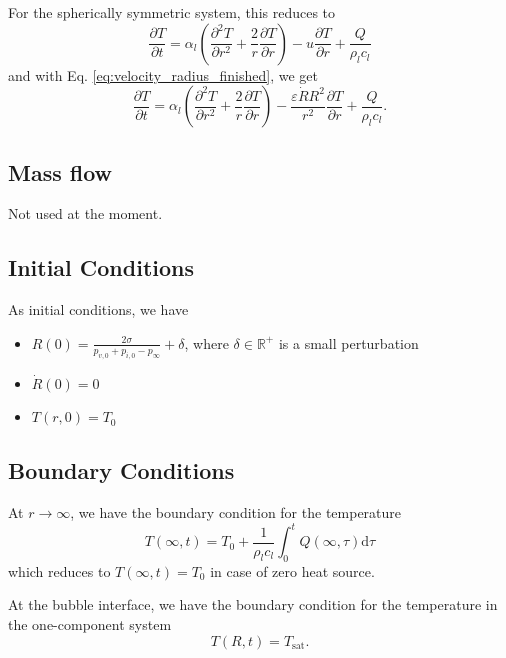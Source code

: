 \documentclass{article}
\numberwithin{equation}{section}
\newcommand{\dd}{\mathrm{d}}
\newcommand{\pd}[2]{\dfrac{\partial #1}{\partial #2}}
\newcommand{\pdd}[2]{\dfrac{\partial^2 #1}{\partial #2^2}}
\begin{document}
For the spherically symmetric system, this reduces to
\begin{equation}
    \pd{T}{t}
    =
    \alpha_l \left(\pdd{T}{r} + \frac{2}{r} \pd{T}{r}\right)
    - u \pd{T}{r}
    + \frac{Q}{\rho_l c_l}
\end{equation}
and with Eq. \eqref{eq:velocity_radius_finished}, we get
\begin{equation}
    \pd{T}{t}
    =
    \alpha_l \left(\pdd{T}{r} + \frac{2}{r} \pd{T}{r}\right)
    - \frac{\varepsilon \dot{R} R^2}{r^2} \pd{T}{r}
    + \frac{Q}{\rho_l c_l}.
    \label{eq:spherically_symmetric_conservation_energy}
\end{equation}

\subsection{Mass flow}

Not used at the moment.

\subsection{Initial Conditions}

As initial conditions, we have
\begin{itemize}
    \item $R(0) = \frac{2\sigma}{p_{v,0} + p_{i,0} - p_\infty} + \delta$, where $\delta \in \mathbb{R}^+$ is a small perturbation
    \item $\dot{R}(0) = 0$
    \item $T(r, 0) = T_0$
\end{itemize}

\subsection{Boundary Conditions}

At $r \rightarrow \infty$, we have the boundary condition for the temperature
\begin{equation}
    T(\infty, t) = T_0 + \frac{1}{\rho_l c_l} \int_{0}^{t} Q(\infty, \tau) \dd \tau
\end{equation}
which reduces to $T(\infty, t) = T_0$ in case of zero heat source.

At the bubble interface, we have the boundary condition for the temperature in the one-component system
\begin{equation}
    T(R, t) = T_\text{sat}.
\end{equation}
\end{document}

